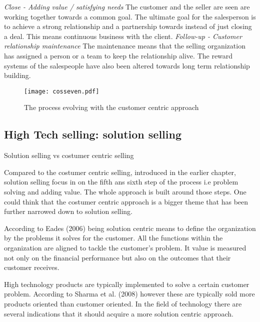 \documentclass[12pt,a4paper,oneside,pdftex]{report}
\begin{document}
\emph{Close - Adding value / satisfying needs}\newline
The customer and the seller are seen are working together towards a common goal. The ultimate goal for the salesperson is to achieve a strong relationship and a partnership towards instead of just closing a deal. This means continuous business with the client. \citep{Moncrief} \newline \newline
\emph{Follow-up - Customer relationship maintenance}\newline
The maintenance means that the selling organization has assigned a person or a team to keep the relationship alive. The reward systems of the salespeople have also been altered towards long term relationship building.  \citep{Moncrief}
\begin{figure}[ht]
  \begin{center}
    \texttt{[image: cosseven.pdf]}
    \caption{The process evolving with the customer centric approach}
    \label{fig:cosseven}
  \end{center}
\end{figure}

\subsection{High Tech selling: solution selling}

Solution selling vs costumer centric selling

Compared to the costumer centric selling, introduced in the earlier chapter, solution selling focus in on the fifth ans sixth step of the process i.e problem solving and adding value. The whole approach is built around those steps. One could think that the costumer centric approach is a bigger theme that has been further narrowed down to solution selling. 

According to Eades (2006) being solution centric means to define the organization by the problems it solves for the customer. All the functions within the organization are aligned to tackle the customer's problem. It value is measured not only on the financial performance but also on the outcomes that their customer receives. 

High technology products are typically implemented to solve a certain customer problem. According to Sharma et al. (2008) however these are typically sold more products oriented than customer oriented. In the field of technology there are several indications that it should acquire a more solution centric approach.
\end{document}
